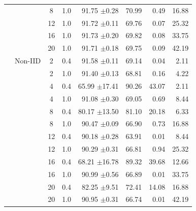 \begin{table}[htbp]
{\begin{tabular}{llccrrrr}
 &  & 8 & 1.0 & 91.75 {\tiny $\pm$0.28} & 70.99 & 0.49 & 16.88 \\
 &  & 12 & 1.0 & 91.72 {\tiny $\pm$0.11} & 69.76 & 0.07 & 25.32 \\
 &  & 16 & 1.0 & 91.73 {\tiny $\pm$0.20} & 69.82 & 0.08 & 33.75 \\
 &  & 20 & 1.0 & 91.71 {\tiny $\pm$0.18} & 69.75 & 0.09 & 42.19 \\
 & Non-IID & 2 & 0.4 & 91.58 {\tiny $\pm$0.11} & 69.14 & 0.04 & 2.11 \\
 &  & 2 & 1.0 & 91.40 {\tiny $\pm$0.13} & 68.81 & 0.16 & 4.22 \\
 &  & 4 & 0.4 & 65.99 {\tiny $\pm$17.41} & 90.26 & 43.07 & 2.11 \\
 &  & 4 & 1.0 & 91.08 {\tiny $\pm$0.30} & 69.05 & 0.69 & 8.44 \\
 &  & 8 & 0.4 & 80.17 {\tiny $\pm$13.50} & 81.10 & 20.18 & 6.33 \\
 &  & 8 & 1.0 & 90.47 {\tiny $\pm$0.09} & 66.90 & 0.73 & 16.88 \\
 &  & 12 & 0.4 & 90.18 {\tiny $\pm$0.28} & 63.91 & 0.01 & 8.44 \\
 &  & 12 & 1.0 & 90.29 {\tiny $\pm$0.31} & 66.81 & 0.94 & 25.32 \\
 &  & 16 & 0.4 & 68.21 {\tiny $\pm$16.78} & 89.32 & 39.68 & 12.66 \\
 &  & 16 & 1.0 & 90.99 {\tiny $\pm$0.56} & 66.89 & 0.01 & 33.75 \\
 &  & 20 & 0.4 & 82.25 {\tiny $\pm$9.51} & 72.41 & 14.08 & 16.88 \\
 &  & 20 & 1.0 & 90.95 {\tiny $\pm$0.31} & 66.74 & 0.01 & 42.19 \\
\bottomrule
\end{tabular}%
}
\end{table}
